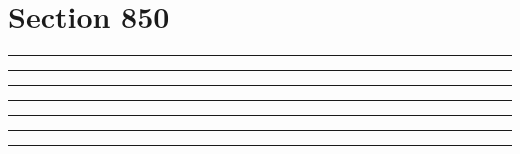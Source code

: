 \documentclass[11pt,a4paper]{article}
\begin{document}
\section{Section 850}
\begin{swarmwrap}%
  \begin{minipage}[t]{4cm}
    \centering
    \textcolor{red!20}{\rule{\linewidth}{6cm}}
  \end{minipage}%
\end{swarmwrap}%
\swarmwrapnext\lipsum[1]\lipsum[2]\lipsum[3]\lipsum[4]\lipsum[5]
\begin{swarmwrap}%
  \begin{minipage}[t]{5cm}
    \centering
    \textcolor{red!20}{\rule{\linewidth}{7cm}}
  \end{minipage}%
\end{swarmwrap}%
\swarmwrapnext\lipsum[1]\lipsum[2]\lipsum[3]\lipsum[4]\lipsum[5]\lipsum[6]
\begin{swarmwrap}%
  \begin{minipage}[t]{2cm}
    \centering
    \textcolor{red!20}{\rule{\linewidth}{8cm}}
  \end{minipage}%
\end{swarmwrap}%
\swarmwrapnext\lipsum[1]
\begin{swarmwrap}%
  \begin{minipage}[t]{3cm}
    \centering
    \textcolor{red!20}{\rule{\linewidth}{9cm}}
  \end{minipage}%
\end{swarmwrap}%
\swarmwrapnext\lipsum[1]\lipsum[2]
\begin{swarmwrap}%
  \begin{minipage}[t]{4cm}
    \centering
    \textcolor{red!20}{\rule{\linewidth}{10cm}}
  \end{minipage}%
\end{swarmwrap}%
\swarmwrapnext\lipsum[1]\lipsum[2]\lipsum[3]
\begin{swarmwrap}%
  \begin{minipage}[t]{5cm}
    \centering
    \textcolor{red!20}{\rule{\linewidth}{2cm}}
  \end{minipage}%
\end{swarmwrap}%
\swarmwrapnext\lipsum[1]\lipsum[2]\lipsum[3]\lipsum[4]
\begin{swarmwrap}%
  \begin{minipage}[t]{2cm}
    \centering
    \textcolor{red!20}{\rule{\linewidth}{3cm}}
  \end{minipage}%
\end{swarmwrap}%
\end{document}
